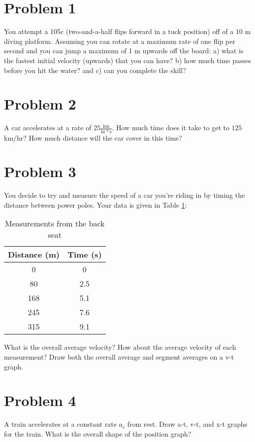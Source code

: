 \documentclass[12pt,letterpaper]{article}
\begin{document}
\section*{Problem 1}

You attempt a 105c (two-and-a-half flips forward in a tuck position) off of a 10 m diving platform. Assuming you can rotate at a maximum rate of one flip per second and you can jump a maximum of 1 m upwards off the board: a) what is the fastest initial velocity (upwards) that you can have? b) how much time passes before you hit the water? and c) can you complete the skill?

\section*{Problem 2}

A car accelerates at a rate of $25 \frac{\mathrm{km}}{\mathrm{hr*s}}$. How much time does it take to get to $125$ km/hr? How much distance will the car cover in this time?

\section*{Problem 3}

You decide to try and measure the speed of a car you're riding in by timing the distance between power poles. Your data is given in Table \ref{tab:q3}:

\begin{table}[h]    %
    \centering  %
    \begin{tabular}{c|c} %

     Distance (m) & Time (s) \\ \hline
        0   &  0  \\
        80   & 2.5   \\
        168   &  5.1  \\
        245   &  7.6  \\
        315   &  9.1  \\

    \end{tabular}
\caption{Measurements from the back seat}
\label{tab:q3}
\end{table}

What is the overall average velocity? How about the average velocity of each measurement? Draw both the overall average and segment averages on a v-t graph.

\section*{Problem 4}

A train accelerates at a constant rate $a_c$ from rest. Draw a-t, v-t, and x-t graphs for the train. What is the overall shape of the position graph?
\end{document}
